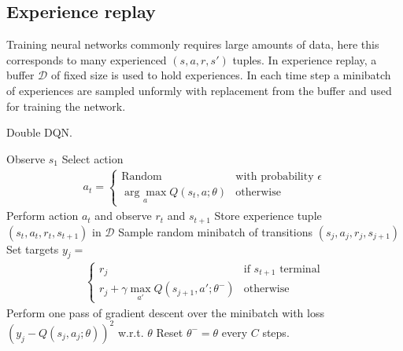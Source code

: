 \documentclass{article}
\begin{document}
\subsection{Experience replay}
Training neural networks commonly requires large amounts of data, here this corresponds to many experienced $(s,a,r,s')$ tuples. In experience replay, a buffer $\mathcal{D}$ of fixed size is used to hold experiences. In each time step a minibatch of experiences are sampled unformly with replacement from the buffer and used for training the network.

\begin{algorithm}[tb]
   \caption{Double DQN.}
   \label{alg:ddqn}
\begin{algorithmic}[1]
    \STATE Observe $s_1$
      \STATE Select action
      \begin{align*}
        a_t = \begin{cases}
          \text{Random} & \text{with probability } \epsilon \\
          \underset{a}{\arg \max} Q(s_t, a; \theta) & \text{otherwise}
        \end{cases}
      \end{align*}
      \STATE Perform action $a_t$ and observe $r_t$ and $s_{t+1}$
      \STATE Store experience tuple $(s_{t}, a_{t}, r_{t}, s_{t+1})$ in $\mathcal{D}$
      \STATE Sample random minibatch of transitions $(s_j, a_j, r_j, s_{j+1})$
      \STATE Set targets $y_j = $
      \begin{align*}
        \begin{cases}
          r_j & \text{if } s_{t+1} \text{ terminal} \\
          r_j + \gamma \max_{a'} Q(s_{j+1}, a'; \theta^{-}) & \text{otherwise}
        \end{cases}
      \end{align*}
      \STATE Perform one pass of gradient descent over the minibatch with loss $(y_j - Q(s_j, a_j; \theta))^2$ w.r.t. $\theta$
      \STATE Reset $\theta^{-} = \theta$ every $C$ steps.
    \ENDFOR
  \ENDFOR
\end{algorithmic}
\end{algorithm}
\end{document}
